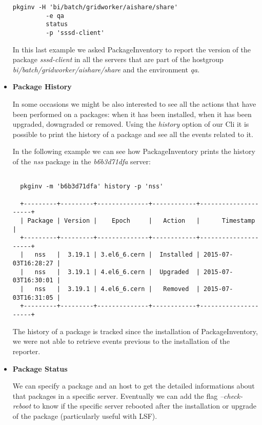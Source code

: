 \begin{itemize}
  \begin{lstlisting}[frame=single]
  pkginv -H 'bi/batch/gridworker/aishare/share'
         -e qa
         status
         -p 'sssd-client'
  \end{lstlisting}

  In this last example we asked PackageInventory to report the version of
  the package \textit{sssd-client} in all the servers that are part of the
  hostgroup \textit{bi/batch/gridworker/aishare/share} and the environment
  \textit{qa}.
  
  \item \textbf{Package History}

  In some occasions we might be also interested to see all the actions
  that have been performed on a packages: when it has been installed, when
  it has been upgraded, downgraded or removed. Using the \textit{history}
  option of our Cli it is possible to print the history of a package and
  see all the events related to it.

  In the following example we can see how PackageInventory prints the
  history of the \textit{nss} package in the \textit{b6b3d71dfa} server:
  \newline{}

  \begin{lstlisting}[frame=single,basicstyle=\footnotesize\ttfamily]
  
  pkginv -m 'b6b3d71dfa' history -p 'nss'
  
  +---------+---------+--------------+------------+---------------------+
  | Package | Version |    Epoch     |   Action   |      Timestamp      |
  +---------+---------+--------------+------------+---------------------+
  |   nss   |  3.19.1 | 3.el6_6.cern |  Installed | 2015-07-03T16:28:27 |
  |   nss   |  3.19.1 | 4.el6_6.cern |  Upgraded  | 2015-07-03T16:30:01 |
  |   nss   |  3.19.1 | 4.el6_6.cern |   Removed  | 2015-07-03T16:31:05 |
  +---------+---------+--------------+------------+---------------------+
  \end{lstlisting}

  The history of a package is tracked since the installation of
  PackageInventory, we were not able to retrieve events previous to the
  installation of the reporter.
 
  \item \textbf{Package Status}

  We can specify a package and an host to get the detailed informations
  about that packages in a specific server. Eventually we can add the flag
  \textit{--check-reboot} to know if the specific server rebooted after
  the installation or upgrade of the package (particularly useful with
  LSF).
 

\end{itemize}
